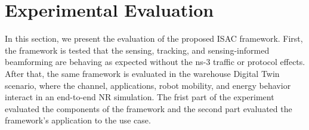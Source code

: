 \section{Experimental Evaluation}
\label{sec:results}

In this section, we present the evaluation of the proposed ISAC framework.
First, the framework is tested that the sensing, tracking, and sensing-informed beamforming are behaving as expected without the ns-3 traffic or protocol effects.
After that, the same framework is evaluated in the warehouse Digital Twin scenario, where the channel, applications, robot mobility, and energy behavior interact in an end-to-end NR simulation.
The frist part of the experiment evaluated the components of the framework and the second part evaluated the framework's application to the use case.



